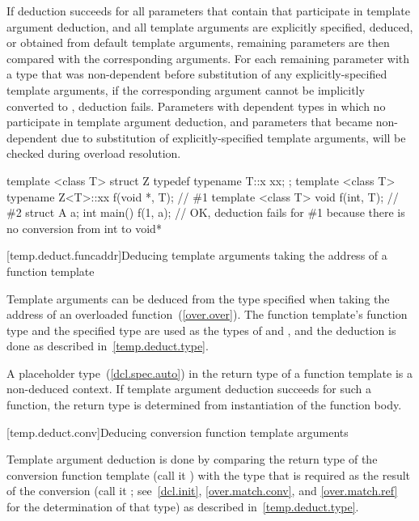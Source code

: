 \pnum
If deduction succeeds for all parameters that contain
 that participate in template argument
deduction, and all template arguments are explicitly specified, deduced,
or obtained from default template arguments, remaining parameters are then
compared with the corresponding arguments. For each remaining parameter
 with a type that was non-dependent before substitution of any
explicitly-specified template arguments, if the corresponding argument
 cannot be implicitly converted to , deduction fails.
\enternote
Parameters with dependent types in which no 
participate in template argument deduction, and parameters that became
non-dependent due to substitution of explicitly-specified template arguments,
will be checked during overload resolution.
\exitnote
\enterexample
\begin{codeblock}
  template <class T> struct Z {
    typedef typename T::x xx;
  };
  template <class T> typename Z<T>::xx f(void *, T); // \#1
  template <class T> void f(int, T);                 // \#2
  struct A {} a;
  int main() {
    f(1, a);                                         // OK, deduction fails for \#1 because there is no conversion from int to void*
  }
\end{codeblock}
\exitexample

[temp.deduct.funcaddr]{Deducing template arguments taking the address of a function template}

\pnum
Template arguments can be deduced from the type specified when taking
the address of an overloaded function~(\ref{over.over}).
The function template's function type and the specified type
are used as the types of
and
,
and the deduction is done as
described in~\ref{temp.deduct.type}.

\pnum
A placeholder type~(\ref{dcl.spec.auto}) in the return type of a
function template is a non-deduced context. If template argument
deduction succeeds for such a function, the return type is determined
from instantiation of the function body.

[temp.deduct.conv]{Deducing conversion function template arguments}

\pnum
Template argument deduction is done by comparing the return type of
the
conversion function template
(call it
)
with the type that is
required as the result of the conversion (call it
; see~\ref{dcl.init}, \ref{over.match.conv}, and \ref{over.match.ref}
for the determination of that type)
as described in~\ref{temp.deduct.type}.

